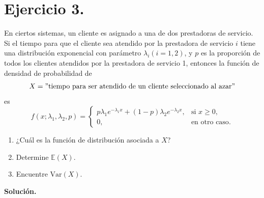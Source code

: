 \documentclass[12pt,a4paper]{article}
\theoremstyle{plain}
\theoremstyle{definition}
\theoremstyle{remark}
\newcommand{\Var}{\text{Var}}
\newcommand{\E}{\mathbb{E}}
\begin{document}
\section*{Ejercicio 3.}
En ciertos sistemas, un cliente es asignado a una de dos prestadoras de servicio. Si el tiempo para que el cliente sea atendido por la prestadora de servicio $i$ tiene una distribución exponencial con parámetro $\lambda_i(i = 1, 2)$, y $p$ es la proporción de todos los clientes atendidos por la prestadora de servicio 1, entonces la función de densidad de probabilidad de
\[
X = "\text{tiempo para ser atendido de un cliente seleccionado al azar}"
\]
es
\[
f(x; \lambda_1, \lambda_2, p) =
\begin{cases}
    p\lambda_1e^{-\lambda_1x} + (1 - p) \lambda_2e^{-\lambda_2x}, & \text{si } x \geq 0,\\
    0, & \text{en otro caso}.
\end{cases}
\]
\begin{enumerate}
    \item[(i)] ¿Cuál es la función de distribución asociada a $X$?
    \item[(ii)] Determine $\E(X)$.
    \item[(iii)] Encuentre $\Var(X)$.
\end{enumerate}
\textbf{Solución.}
\end{document}
